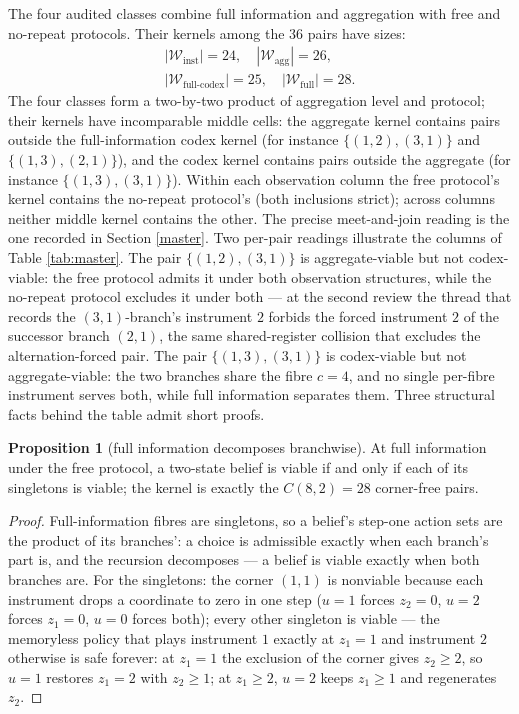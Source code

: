 \documentclass[10pt,twocolumn]{article}
\theoremstyle{definition}
\newtheorem{proposition}{Proposition}
\begin{document}
The four audited classes combine full information and aggregation with
free and no-repeat protocols. Their kernels among the 36 pairs have
sizes:
\begin{gather*}
|\mathcal{W}_{\mathrm{inst}}| = 24,\quad
|\mathcal{W}_{\mathrm{agg}}| = 26,\\
|\mathcal{W}_{\mathrm{full\text{-}codex}}| = 25,\quad
|\mathcal{W}_{\mathrm{full}}| = 28 .
\end{gather*}
The four classes form a two-by-two product of aggregation level and
protocol; their kernels have incomparable middle cells:
the aggregate kernel contains pairs outside the full-information codex
kernel (for instance \(\{(1,2),(3,1)\}\) and \(\{(1,3),(2,1)\}\)), and
the codex kernel contains pairs outside the aggregate (for instance
\(\{(1,3),(3,1)\}\)). Within each observation column the free protocol's
kernel contains the no-repeat protocol's (both inclusions strict); across
columns neither middle kernel contains the other. The precise
meet-and-join reading is the one recorded in Section \ref{master}. Two
per-pair readings illustrate the columns of Table \ref{tab:master}. The
pair \(\{(1,2),(3,1)\}\) is aggregate-viable but not codex-viable: the
free protocol admits it under both observation structures, while the
no-repeat protocol excludes it under both --- at the second review the
thread that records the \((3,1)\)-branch's instrument \(2\) forbids the
forced instrument \(2\) of the successor branch \((2,1)\), the same
shared-register collision that excludes the alternation-forced pair. The pair \(\{(1,3),(3,1)\}\) is
codex-viable but not aggregate-viable: the two branches share the fibre
\(c = 4\), and no single per-fibre instrument serves both, while
full information separates them. Three structural facts behind the table
admit short proofs.

\begin{proposition}[full information decomposes branchwise]\label{prop:decomp}
At full information under the free protocol, a two-state belief is
viable if and only if each of its singletons is viable; the kernel is
exactly the \(C(8,2) = 28\) corner-free pairs.
\end{proposition}

\begin{proof}
Full-information fibres are singletons, so a belief's step-one action
sets are the product of its branches': a choice is admissible exactly
when each branch's part is, and the recursion decomposes --- a belief is
viable exactly when both branches are. For the singletons: the corner
\((1,1)\) is nonviable because each instrument drops a coordinate to
zero in one step (\(u = 1\) forces \(z_2 = 0\), \(u = 2\) forces
\(z_1 = 0\), \(u = 0\) forces both); every other singleton is viable
--- the memoryless policy that plays instrument \(1\) exactly at
\(z_1 = 1\) and instrument \(2\) otherwise is safe forever: at
\(z_1 = 1\) the exclusion of the corner gives \(z_2 \ge 2\), so
\(u = 1\) restores \(z_1 = 2\) with \(z_2 \ge 1\); at
\(z_1 \ge 2\), \(u = 2\) keeps \(z_1 \ge 1\) and regenerates
\(z_2\).
\end{proof}
\end{document}
